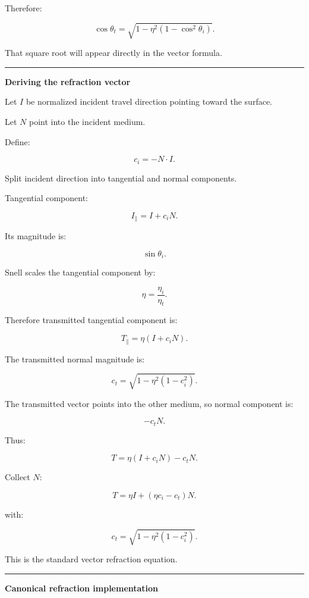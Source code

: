 Therefore:

\[
\boxed{
\cos\theta_t
=
\sqrt{
1-
\eta^2
(1-\cos^2\theta_i)
}.
}
\]

That square root will appear directly in the vector formula.

\begin{center}\rule{0.5\linewidth}{0.5pt}\end{center}

\textbf{Deriving the refraction vector}

Let \(I\) be normalized incident travel direction pointing toward the surface.

Let \(N\) point into the incident medium.

Define:

\[
c_i=-N\cdot I.
\]

Split incident direction into tangential and normal components.

Tangential component:

\[
I_\parallel
=
I+c_iN.
\]

Its magnitude is:

\[
\sin\theta_i.
\]

Snell scales the tangential component by:

\[
\eta=\frac{\eta_i}{\eta_t}.
\]

Therefore transmitted tangential component is:

\[
T_\parallel=
\eta(I+c_iN).
\]

The transmitted normal magnitude is:

\[
c_t=
\sqrt{
1-\eta^2(1-c_i^2)
}.
\]

The transmitted vector points into the other medium, so normal component is:

\[
-c_tN.
\]

Thus:

\[
T=
\eta(I+c_iN)-c_tN.
\]

Collect \(N\):

\[
\boxed{
T=
\eta I+
(\eta c_i-c_t)N.
}
\]

with:

\[
\boxed{
c_t=
\sqrt{
1-\eta^2(1-c_i^2)
}.
}
\]

This is the standard vector refraction equation.

\begin{center}\rule{0.5\linewidth}{0.5pt}\end{center}

\textbf{Canonical refraction implementation}

